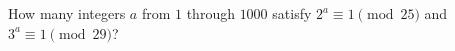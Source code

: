How many integers $a$ from $1$ through $1000$ satisfy $2^a\equiv1\pmod{25}$ and $3^a\equiv1\pmod{29}$?
